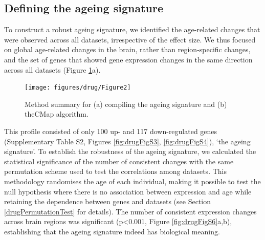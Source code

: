 \documentclass[12pt,twoside]{unicam}
\begin{document}
\hypertarget{ArrayAgeingSignatureResult}{%
\subsection{Defining the ageing signature}\label{ArrayAgeingSignatureResult}}

To construct a robust ageing signature, we identified the age-related changes that were observed across all datasets, irrespective of the effect size. We thus focused on global age-related changes in the brain, rather than region-specific changes, and the set of genes that showed gene expression changes in the same direction across all datasets (Figure \ref{fig:drugFig2}a).

\begin{figure}

{\centering \texttt{[image: figures/drug/Figure2]} 

}

\caption[Summary of the methods.]{Method summary for (a) compiling the ageing signature and (b) theCMap algorithm.}\label{fig:drugFig2}
\end{figure}

This profile consisted of only 100 up- and 117 down-regulated genes (Supplementary Table S2, Figures \ref{fig:drugFigS3}, \ref{fig:drugFigS4}), `the ageing signature'. To establish the robustness of the ageing signature, we calculated the statistical significance of the number of consistent changes with the same permutation scheme used to test the correlations among datasets. This methodology randomises the age of each individual, making it possible to test the null hypothesis where there is no association between expression and age while retaining the dependence between genes and datasets (see Section \ref{drugPermutationTest} for details). The number of consistent expression changes across brain regions was significant (p\textless0.001, Figure \ref{fig:drugFigS6}a,b), establishing that the ageing signature indeed has biological meaning.
\end{document}
